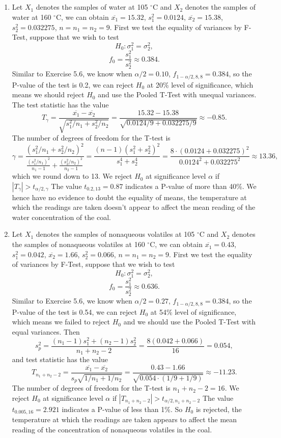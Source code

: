 \documentclass[11pt,a4paper]{article}
\begin{document}
\subsection{}
\begin{enumerate}[label=\roman*)]
\item
Let $X_1$ denotes the samples of water at 105 $^\circ$C and $X_2$ denotes the samples of water at 160 $^\circ$C, we can obtain $\overline{x_1}=15.32$, $s_1^2=0.0124$, $\overline{x_2}=15.38$, $s_2^2=0.032275$, $n=n_1=n_2=9$.
First we test the equality of variances by F-Test, suppose that we wish to test
$$H_0:\sigma_1^2=\sigma_2^2,$$
$$f_0=\frac{s_1^2}{s_2^2}\approx0.384.$$
Similar to Exercise 5.6, we know when $\alpha/2=0.10$, $f_{1-\alpha/2,8,8}=0.384$, so the P-value of the test is 0.2, we can reject $H_0$ at 20\% level of significance, which means we should reject $H_0$ and use the Pooled T-Test with unequal variances. The test statistic has the value
$$T_{\gamma}=\frac{\overline{x_1}-\overline{x_2}}{\sqrt{s_1^2/n_1+s_2^2/n_2}}=\frac{15.32-15.38}{\sqrt{0.0124/9+0.032275/9}}\approx-0.85.$$
The number of degrees of freedom for the T-test is
$$\gamma=\frac{(s_1^2/n_1+s_2^2/n_2)^2}{\frac{(s_1^2/n_1)^2}{n_1-1}+\frac{(s_2^2/n_2)^2}{n_2-1}}=\frac{(n-1)(s_1^2+s_2^2)^2}{s_1^4+s_2^4}=\frac{8\cdot(0.0124+0.032275)^2}{0.0124^2+0.032275^2}\approx 13.36,$$
which we round down to 13. We reject $H_0$ at significance level $\alpha$ if $|T_\gamma|>t_{\alpha/2,\gamma}$ The value $t_{0.2,13}=0.87$ indicates a P-value of more than 40\%. We hence have no evidence to doubt the equality of means, the temperature at which the readings are taken doesn't appear to affect the mean reading of the water concentration of the coal.
\item
Let $X_1$ denotes the samples of nonaqueous volatiles at 105 $^\circ$C and $X_2$ denotes the samples of nonaqueous volatiles at 160 $^\circ$C, we can obtain $\overline{x_1}=0.43$, $s_1^2=0.042$, $\overline{x_2}=1.66$, $s_2^2=0.066$, $n=n_1=n_2=9$.
First we test the equality of variances by F-Test, suppose that we wish to test
$$H_0:\sigma_1^2=\sigma_2^2,$$
$$f_0=\frac{s_1^2}{s_2^2}\approx0.636.$$
Similar to Exercise 5.6, we know when $\alpha/2=0.27$, $f_{1-\alpha/2,8,8}=0.384$, so the P-value of the test is 0.54, we can reject $H_0$ at 54\% level of significance, which means we failed to reject $H_0$ and we should use the Pooled T-Test with equal variances. Then
$$s_p^2=\frac{(n_1-1)s_1^2+(n_2-1)s_2^2}{n_1+n_2-2}=\frac{8(0.042+0.066)}{16}=0.054,$$
and test statistic has the value
$$T_{n_1+n_2-2}=\frac{\overline{x_1}-\overline{x_2}}{s_p\sqrt{1/n_1+1/n_2}}=\frac{0.43-1.66}{\sqrt{0.054\cdot(1/9+1/9)}}\approx-11.23.$$
The number of degrees of freedom for the T-test is
$n_1+n_2-2=16$. We reject $H_0$ at significance level $\alpha$ if $|T_{n_1+n_2-2}|>t_{\alpha/2,n_1+n_2-2}$ The value $t_{0.005,16}=2.921$ indicates a P-value of less than 1\%. So $H_0$ is rejected, the temperature at which the readings are taken appears to affect the mean reading of the concentration of nonaqueous volatiles in the coal.
\end{enumerate}
\end{document}
